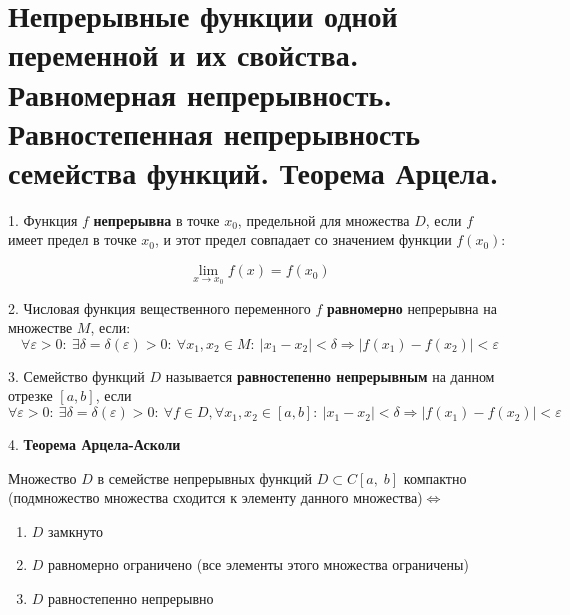 \section{
	Непрерывные функции одной переменной и их свойства. \\
	Равномерная непрерывность. Равностепенная непрерывность семейства функций. Теорема Арцела.
}

1. Функция $f$ \textbf{непрерывна} в точке $x_{0}$, предельной для множества $D$, если $f$ имеет предел в точке $x_{0}$, и этот предел совпадает со значением функции $f(x_{0})$:

$$
\lim _{x\rightarrow x_{0}} f(x) = f(x_{0}) 
$$

2. Числовая функция вещественного переменного $f$ \textbf{равномерно} непрерывна на множестве $M$, если: 
$$
\forall \varepsilon >0 \colon 
~\exists \delta =\delta (\varepsilon )>0\colon 
~\forall x_{1},x_{2}\in M\colon 
~|x_{1}-x_{2}|<\delta \Rightarrow |f(x_{1})-f(x_{2})|<\varepsilon
$$

3. Семейство функций $D$ называется \textbf{равностепенно непрерывным} на данном отрезке $[a, b]$, если 
$$
\forall \varepsilon >0 \colon 
~\exists \delta =\delta (\varepsilon )>0\colon
~\forall f \in D, \forall x_{1},x_{2} \in[a, b]\colon
~|x_{1}-x_{2}| < \delta \Rightarrow |f(x_{1})-f(x_{2})|<\varepsilon
$$

4. \textbf{Теорема Арцела-Асколи}

Множество $D$ в семействе непрерывных функций $D \subset C[a,\;b]$ компактно (подмножество множества сходится к элементу данного множества)$\Leftrightarrow$
\begin{enumerate}
	\item $D$ замкнуто
	\item $D$ равномерно ограничено (все элементы этого множества ограничены)
	\item $D$ равностепенно непрерывно
\end{enumerate}